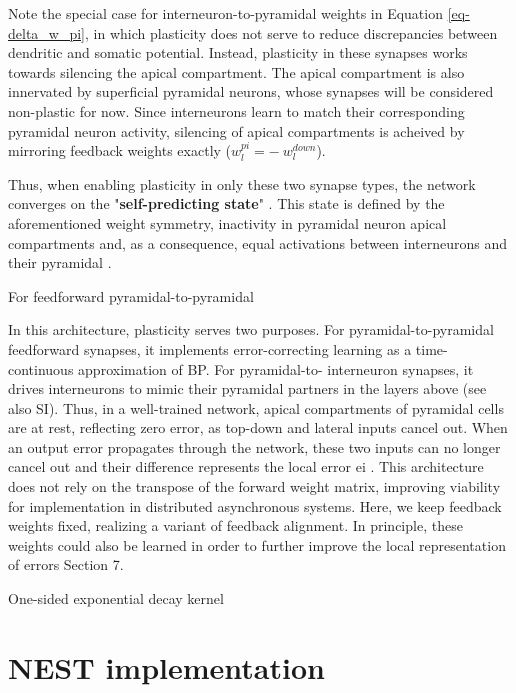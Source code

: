 Note the special case for interneuron-to-pyramidal weights in Equation \ref{eq-delta_w_pi}, in which plasticity does not serve to reduce
discrepancies between dendritic and somatic potential. Instead, plasticity in these synapses works towards silencing the
apical compartment. The apical compartment is also innervated by superficial pyramidal neurons, whose synapses will
be considered non-plastic for now. Since interneurons learn to match their corresponding pyramidal neuron activity,
silencing of apical compartments is acheived by mirroring feedback weights exactly ($w_l^{pi} = -\ w_l^{down}$).\newline

Thus, when enabling plasticity in only these two synapse types, the network converges on the
"\textbf{self-predicting state}" \citep{sacramento2018dendritic}.
This state is defined by the aforementioned weight symmetry, inactivity in pyramidal neuron apical compartments and,
as a consequence, equal activations between interneurons and their pyramidal .




For feedforward pyramidal-to-pyramidal

In this architecture, plasticity serves two purposes. For pyramidal-to-pyramidal feedforward synapses,
it implements error-correcting learning as a time-continuous approximation of BP. For pyramidal-to-
interneuron synapses, it drives interneurons to mimic their pyramidal partners in the layers above (see
also SI). Thus, in a well-trained network, apical compartments of pyramidal cells are at rest, reflecting
zero error, as top-down and lateral inputs cancel out. When an output error propagates through the
network, these two inputs can no longer cancel out and their difference represents the local error ei .
This architecture does not rely on the transpose of the forward weight matrix, improving viability for
implementation in distributed asynchronous systems. Here, we keep feedback weights fixed, realizing
a variant of feedback alignment. In principle, these weights could also be learned in order to further
improve the local representation of errors Section 7.






One-sided exponential decay kernel

\section{NEST implementation}

